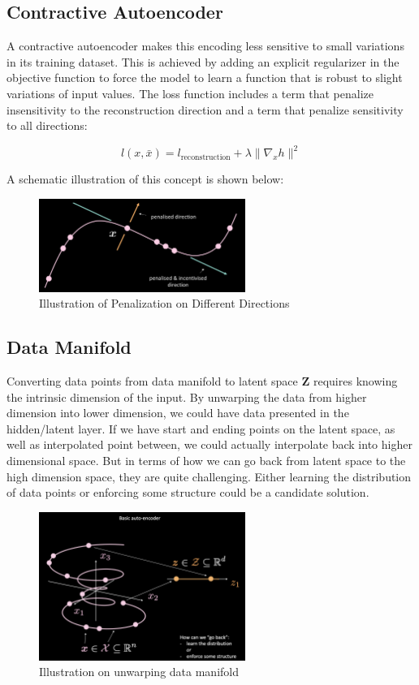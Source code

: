 \subsection{Contractive Autoencoder}

A contractive autoencoder makes this encoding less sensitive to small variations in its training dataset. This is achieved by adding an explicit regularizer in the objective function to force the model to learn a function that is robust to slight variations of input values. The loss function includes a term that penalize insensitivity to the reconstruction direction and a term that penalize sensitivity to all directions:

$$l(x,\bar{x}) = l_{\text{reconstruction}} + \lambda \| \nabla_x h \|^2$$

A schematic illustration of this concept is shown below: 

\begin{figure}[H]
    \centering
    \includegraphics[width=0.6\textwidth]{labs/10/images/Contractive_AutoEncoder.png}
    \caption{Illustration of Penalization on Different Directions}
    \label{fig:Contractive_AutoEncoder}
\end{figure}

\subsection{Data Manifold}

Converting data points from data manifold to latent space \textbf{Z} requires knowing the intrinsic dimension of the input. By unwarping the data from higher dimension into lower dimension, we could have data presented in the hidden/latent layer. If we have start and ending points on the latent space, as well as interpolated point between, we could actually interpolate back into higher dimensional space. But in terms of how we can go back from latent space to the high dimension space, they are quite challenging. Either learning the distribution of data points or enforcing some structure could be a candidate solution.

\begin{figure}[htb]
    \centering
    \includegraphics[width=0.6\textwidth]{labs/10/images/Data_manifold.png}
    \caption{Illustration on unwarping data manifold}
    \label{fig:Data_manifold}
\end{figure}